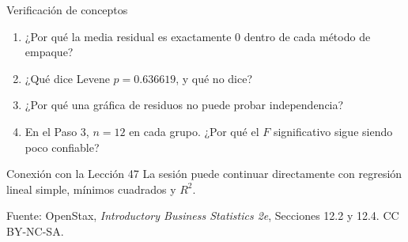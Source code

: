 \documentclass[aspectratio=169,10pt,spanish]{beamer}
\begin{document}
\begin{frame}{Verificación de conceptos}
  \begin{enumerate}
    \item ¿Por qué la media residual es exactamente 0 dentro de cada método
      de empaque?
    \item ¿Qué dice Levene $p=0.636619$, y qué no dice?
    \item ¿Por qué una gráfica de residuos no puede probar independencia?
    \item En el Paso 3, $n=12$ en cada grupo. ¿Por qué el $F$ significativo
      sigue siendo poco confiable?
  \end{enumerate}

  \vspace{0.6em}
  \begin{block}{Conexión con la Lección 47}
    La sesión puede continuar directamente con regresión lineal simple,
    mínimos cuadrados y $R^2$.
  \end{block}

  \vfill
  \scriptsize Fuente: OpenStax, \textit{Introductory Business Statistics 2e},
  Secciones 12.2 y 12.4. CC BY-NC-SA.
\end{frame}

\appendix
\end{document}
